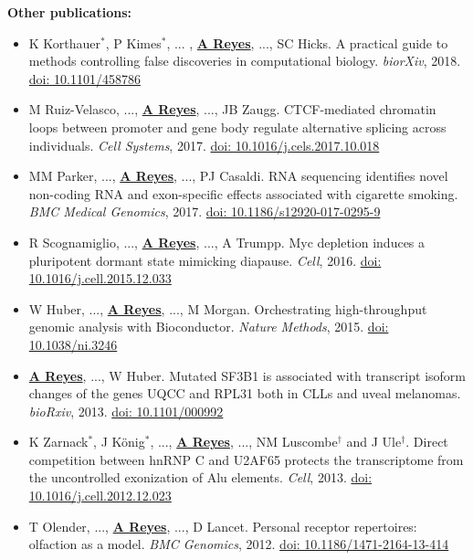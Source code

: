 \documentclass[11pt,a4paper,sans]{moderncv} %
\begin{document}
\textbf{Other publications:}
\begin{itemize}
\item K Korthauer$^{\ast}$, P Kimes$^{\ast}$, ... , \textbf{\underline{A Reyes}}, ..., SC Hicks. A practical guide to methods controlling false discoveries in computational biology. \textit{biorXiv}, 2018. \href{http://dx.doi.org/10.1101/458786}{doi: 10.1101/458786}
\item M Ruiz-Velasco, ..., \textbf{\underline{A Reyes}}, ..., JB Zaugg. CTCF-mediated chromatin loops between promoter and gene body regulate alternative splicing across individuals. \textit{Cell Systems}, 2017. \href{http://dx.doi.org/10.1016/j.cels.2017.10.018}{doi: 10.1016/j.cels.2017.10.018}
\item MM Parker, ..., \textbf{\underline{A Reyes}}, ..., PJ Casaldi. RNA sequencing identifies novel non-coding RNA and exon-specific effects associated with cigarette smoking. \textit{BMC Medical Genomics}, 2017. \href{https://doi.org/10.1186/s12920-017-0295-9}{doi: 10.1186/s12920-017-0295-9}
\item R Scognamiglio, ..., \textbf{\underline{A Reyes}}, ..., A Trumpp. Myc depletion induces a pluripotent dormant state mimicking diapause. \textit{Cell}, 2016. \href{https://doi.org/10.1016/j.cell.2015.12.033}{doi: 10.1016/j.cell.2015.12.033}
\item W Huber, ..., \textbf{\underline{A Reyes}}, ..., M Morgan. Orchestrating high-throughput genomic analysis with Bioconductor. \textit{Nature Methods}, 2015. \href{https://doi.org/10.1038/ni.3246}{doi: 10.1038/ni.3246}
\item \textbf{\underline{A Reyes}}, ..., W Huber. Mutated SF3B1 is associated with transcript isoform changes of the genes UQCC and RPL31 both in CLLs and uveal melanomas. \textit{bioRxiv}, 2013. \href{https://doi.org/10.1101/000992}{doi: 10.1101/000992}
\item K Zarnack$^{\ast}$, J K\"{o}nig$^{\ast}$, ..., \textbf{\underline{A Reyes}}, ..., NM Luscombe$^{\dagger}$ and J Ule$^{\dagger}$. Direct competition between hnRNP C and U2AF65 protects the transcriptome from the uncontrolled exonization of Alu elements. \textit{Cell}, 2013. \href{https://doi.org/10.1016/j.cell.2012.12.023}{doi: 10.1016/j.cell.2012.12.023}
\item T Olender, ..., \textbf{\underline{A Reyes}}, ..., D Lancet. Personal receptor repertoires: olfaction as a model. \textit{BMC Genomics}, 2012. \href{https://doi.org/10.1186/1471-2164-13-414}{doi: 10.1186/1471-2164-13-414}
\end{itemize}
\vspace{-.13cm}
\end{document}
